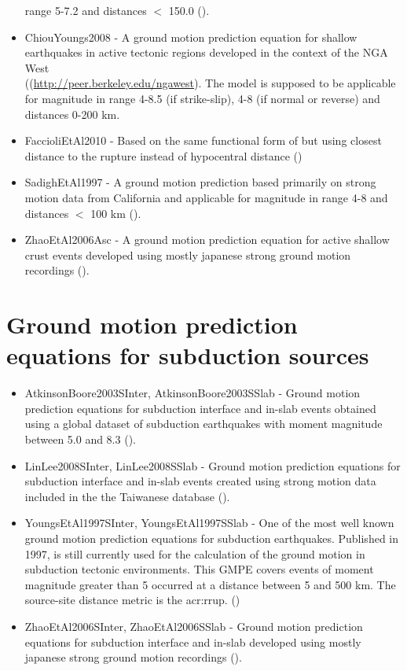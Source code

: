 \begin{itemize}
        range 5-7.2 and distances $<$ 150.0 (\cite{cauzzi2008}).
    \item ChiouYoungs2008 - A ground motion prediction equation 
        for shallow earthquakes in active tectonic regions developed in 
        the context of the NGA West \hfill \\
        ((\href{http://peer.berkeley.edu/ngawest/}{http://peer.berkeley.edu/ngawest}).
        The model is supposed to be applicable for magnitude in range 4-8.5 (if strike-slip),
        4-8 (if normal or reverse) and distances 0-200 km.
    \item FaccioliEtAl2010 - Based on the same functional form of \cite{cauzzi2008} but using
         closest distance to the rupture instead of hypocentral distance (\cite{faccioli2010})
    \item SadighEtAl1997 - A ground motion prediction based primarily on strong motion data 
        from California and applicable for magnitude in range 4-8 and distances $<$ 100 km (\cite{sadigh1997}).
    \item ZhaoEtAl2006Asc - A ground motion prediction equation 
        for active shallow crust events developed using mostly japanese strong ground motion 
        recordings (\cite{zhao2006}).
\end{itemize}
%
\section{Ground motion prediction equations for subduction sources}
\begin{itemize}
    \item AtkinsonBoore2003SInter, AtkinsonBoore2003SSlab - Ground motion prediction equations for 
        subduction interface and in-slab events obtained using a global 
        dataset of subduction earthquakes with moment magnitude between 
        5.0 and 8.3 (\cite{atkinson2003}).
    \item LinLee2008SInter, LinLee2008SSlab - Ground motion prediction equations for subduction
        interface and in-slab events created using strong motion
        data included in the the Taiwanese database (\cite{lin2008}).
    \item YoungsEtAl1997SInter, YoungsEtAl1997SSlab - One of the most well known ground motion 
        prediction equations for subduction earthquakes. Published in 1997,
        is still currently used for the calculation of the ground motion 
        in subduction tectonic environments. This GMPE covers events of 
        moment magnitude greater than 5 occurred at a distance between 5
        and 500 km. The source-site distance metric is the \gls{acr:rrup}. (\cite{youngs1997})
    \item ZhaoEtAl2006SInter, ZhaoEtAl2006SSlab - Ground motion prediction equations 
        for subduction interface and in-slab developed using mostly japanese strong ground motion 
        recordings (\cite{zhao2006}).
\end{itemize}
%
